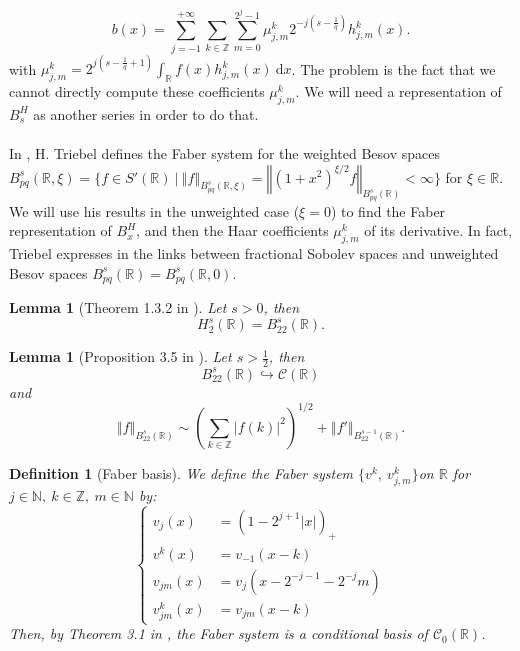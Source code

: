 \documentclass[11pt]{article}
\newtheorem{defi}{Definition}
\newtheorem{lem}[theo]{Lemma}
\newcommand{\norme}[1]{\left\Vert #1\right\Vert}
\newcommand{\R}{\mathbb{R}}
\newcommand{\Z}{\mathbb{Z}}
\newcommand{\N}{\mathbb{N}}
\newcommand{\di}{\mathrm{d}}
\begin{document}
\begin{equation}
b(x) = \sum_{j=-1}^{+\infty}\sum_{k\in\Z}\sum_{m=0}^{2^j-1}\mu_{j,m}^k2^{-j\left(s-\frac{1}{q}\right)}h_{j,m}^k(x).
\end{equation}
with $\mu_{j,m}^k = 2^{j\left(s-\frac{1}{q}+1\right)}\int_{\R}f(x)h_{j,m}^k(x)\ \di x$. The problem is the fact that we cannot directly compute these coefficients $\mu_{j,m}^k$. We will need a representation of $B^H_s$ as another series in order to do that.

\paragraph{}
In \cite{Tri-fab}, H. Triebel defines the Faber system for the weighted Besov spaces $B^{s}_{pq}(\R,\xi)=\{f\in S'(\R)\ |\ \norme{f}_{B^{s}_{pq}(\R,\xi)} = \norme{(1+x^2)^{\xi/2}f}_{B^{s}_{pq}(\R)} < \infty\}$ for $\xi\in\R$. We will use his results in the unweighted case ($\xi = 0$) to find the Faber representation of $B^H_x$, and then the Haar coefficients $\mu^k_{j,m}$ of its derivative. In fact, Triebel expresses in \cite{Tri-fun} the links between fractional Sobolev spaces and unweighted Besov spaces $B^{s}_{pq}(\R)=B^{s}_{pq}(\R,0)$.

\begin{lem}[Theorem 1.3.2 in \cite{Tri-fun}]
    Let $s>0$, then \begin{equation}
    H^s_2(\R)=B^s_{22}(\R).
    \end{equation}
\end{lem}

\begin{lem}[Proposition 3.5 in \cite{Tri-fab}]\label{emb}
    Let $s>\frac{1}{2}$, then 
    \begin{equation}
    B^s_{22}(\R) \hookrightarrow \mathcal{C}(\R)
    \end{equation}
    and
    \begin{equation}
    \norme{f}_{B^s_{22}(\R)} \sim \left(\sum_{k\in\Z} |f(k)|^2\right)^{1/2}+\norme{f'}_{B^{s-1}_{22}(\R)}.
    \end{equation}
\end{lem}

\begin{defi}[Faber basis]
    We define the Faber system $\{v^k,\ v^k_{j,m}\}$on $\R$ for $j\in\N,\ k\in\Z,\ m\in\N$ by:
    \begin{equation}
    \begin{cases}
    v_j(x) &= (1-2^{j+1}|x|)_+\\
    v^k(x) &= v_{-1}(x-k)\\
    v_{jm}(x) &= v_j(x-2^{-j-1}-2^{-j}m)\\
    v_{jm}^k(x) &= v_{jm}(x-k)
    \end{cases}
    \end{equation}
    Then, by Theorem 3.1 in \cite{Tri-fab}, the Faber system is a conditional basis of $\mathcal{C}_0(\R)$.
\end{defi}
\end{document}
